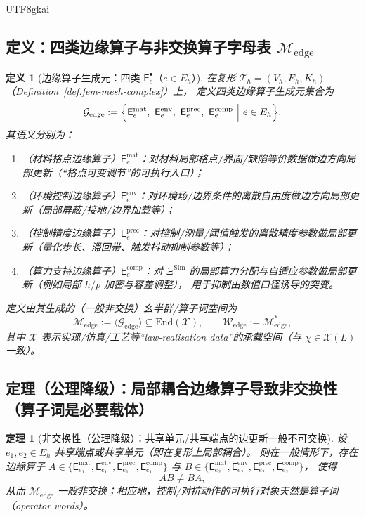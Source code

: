 \documentclass[12pt]{article}
\newtheorem{definition}{定义}[section]
\newtheorem{theorem}{定理}[section]
\begin{document}
\begin{CJK*}{UTF8}{gkai}
\subsection{定义：四类边缘算子与非交换算子字母表 $\mathcal{M}_{\mathrm{edge}}$}

\begin{definition}[边缘算子生成元：四类 $\mathsf{E}^{\bullet}_e$（$e\in E_h$）]
\label{def:edge-operator-generators}
在复形 $\mathcal{T}_h=(V_h,E_h,K_h)$（Definition~\ref{def:fem-mesh-complex}）上，
定义四类边缘算子生成元集合为
\[
\mathcal{G}_{\mathrm{edge}}
:=
\Bigl\{
\mathsf{E}^{\mathrm{mat}}_{e},\
\mathsf{E}^{\mathrm{env}}_{e},\
\mathsf{E}^{\mathrm{prec}}_{e},\
\mathsf{E}^{\mathrm{comp}}_{e}
\ \Big|\ e\in E_h
\Bigr\}.
\]
其语义分别为：
\begin{enumerate}
  \item（材料格点边缘算子）$\mathsf{E}^{\mathrm{mat}}_{e}$：对材料局部格点/界面/缺陷等价数据做边方向局部更新（“格点可变调节”的可执行入口）；
  \item（环境控制边缘算子）$\mathsf{E}^{\mathrm{env}}_{e}$：对环境场/边界条件的离散自由度做边方向局部更新（局部屏蔽/接地/边界加载等）；
  \item（控制精度边缘算子）$\mathsf{E}^{\mathrm{prec}}_{e}$：对控制/测量/阈值触发的离散精度参数做局部更新（量化步长、滞回带、触发抖动抑制参数等）；
  \item（算力支持边缘算子）$\mathsf{E}^{\mathrm{comp}}_{e}$：对 $\Xi^{\mathrm{Sim}}$ 的局部算力分配与自适应参数做局部更新（例如局部 $h/p$ 加密与容差调整），
    用于抑制由数值口径诱导的突变。
\end{enumerate}
定义由其生成的（一般非交换）幺半群/算子词空间为
\[
\mathcal{M}_{\mathrm{edge}}:=\langle \mathcal{G}_{\mathrm{edge}}\rangle\subseteq \mathrm{End}(\mathcal{X}),
\qquad
\mathcal{W}_{\mathrm{edge}}:=\mathcal{M}_{\mathrm{edge}}^\ast,
\]
其中 $\mathcal{X}$ 表示实现/仿真/工艺等“law-realisation data”的承载空间（与 $\chi\in\mathcal{X}(L)$ 一致）。
\end{definition}

\subsection{定理（公理降级）：局部耦合边缘算子导致非交换性（算子词是必要载体）}

\begin{theorem}[非交换性（公理降级）：共享单元/共享端点的边更新一般不可交换]
\label{thm:edge-operator-noncommutative}
设 $e_1,e_2\in E_h$ 共享端点或共享单元（即在复形上局部耦合）。
则在一般情形下，存在边缘算子 $A\in\{\mathsf{E}^{\mathrm{mat}}_{e_1},\mathsf{E}^{\mathrm{env}}_{e_1},\mathsf{E}^{\mathrm{prec}}_{e_1},
  \mathsf{E}^{\mathrm{comp}}_{e_1}\}$ 与
$B\in\{\mathsf{E}^{\mathrm{mat}}_{e_2},\mathsf{E}^{\mathrm{env}}_{e_2},\mathsf{E}^{\mathrm{prec}}_{e_2},\mathsf{E}
  ^{\mathrm{comp}}_{e_2}\}$，
使得
\[
AB\neq BA,
\]
从而 $\mathcal{M}_{\mathrm{edge}}$ 一般非交换；相应地，控制/对抗动作的可执行对象天然是算子词（operator words）。
\end{theorem}


\end{CJK*}
\end{document}
